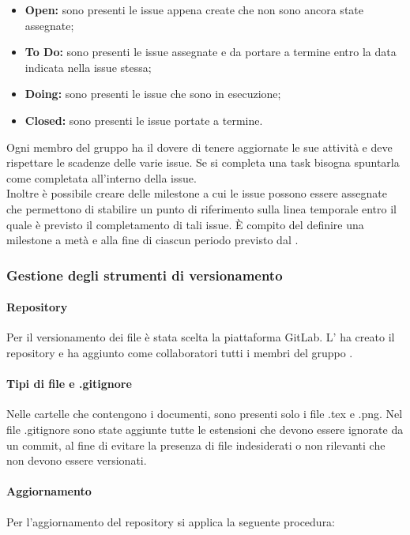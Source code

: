 \begin{itemize}
	\item \textbf{Open:} sono presenti le issue appena create che non sono ancora state assegnate;
	\item \textbf{To Do:} sono presenti le issue assegnate e da portare a termine entro la data indicata nella issue stessa;
	\item \textbf{Doing:} sono presenti le issue che sono in esecuzione;
	\item \textbf{Closed:} sono presenti le issue portate a termine.
\end{itemize}
Ogni membro del gruppo ha il dovere di tenere aggiornate le sue attività e deve rispettare le scadenze delle varie issue. Se si completa una task bisogna spuntarla come completata all'interno della issue.\\
Inoltre è possibile creare delle milestone a cui le issue possono essere assegnate che permettono di stabilire un punto di riferimento sulla linea temporale entro il quale è previsto il completamento di tali issue. È compito del \roleProjectManager{} definire una milestone a metà e alla fine di ciascun periodo previsto dal \docNameVersionPdP{}.

\subsubsection{Gestione degli strumenti di versionamento} \label{paragraph:Strumenti_versionamento}

\paragraph{Repository}
Per il versionamento dei file è stata scelta la piattaforma GitLab. L'\roleAdministrator{} ha creato il repository e ha aggiunto come collaboratori tutti i membri del gruppo \groupName{}.\\

\paragraph{Tipi di file e .gitignore}
Nelle cartelle che contengono i documenti, sono presenti solo i file .tex e .png. Nel file .gitignore sono state aggiunte tutte le estensioni che devono essere ignorate da un commit, al fine di evitare la presenza di file indesiderati o non rilevanti che non devono essere versionati.

\paragraph{Aggiornamento}
Per l'aggiornamento del repository si applica la seguente procedura:

